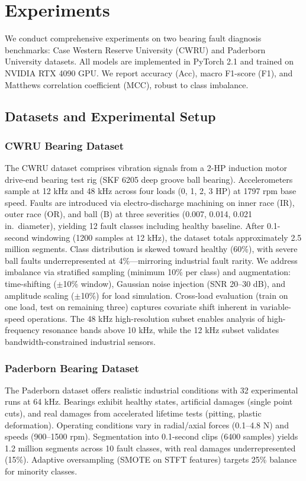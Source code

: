 \section{Experiments}

We conduct comprehensive experiments on two bearing fault diagnosis benchmarks: Case Western Reserve University (CWRU) and Paderborn University datasets. All models are implemented in PyTorch 2.1 and trained on NVIDIA RTX 4090 GPU. We report accuracy (Acc), macro F1-score (F1), and Matthews correlation coefficient (MCC), robust to class imbalance.

\subsection{Datasets and Experimental Setup}

\subsubsection{CWRU Bearing Dataset}
The CWRU dataset \cite{cite6} comprises vibration signals from a 2-HP induction motor drive-end bearing test rig (SKF 6205 deep groove ball bearing). Accelerometers sample at 12 kHz and 48 kHz across four loads (0, 1, 2, 3 HP) at 1797 rpm base speed. Faults are introduced via electro-discharge machining on inner race (IR), outer race (OR), and ball (B) at three severities (0.007, 0.014, 0.021 in.\ diameter), yielding 12 fault classes including healthy baseline. After 0.1-second windowing (1200 samples at 12 kHz), the dataset totals approximately 2.5 million segments. Class distribution is skewed toward healthy (60\%), with severe ball faults underrepresented at 4\%---mirroring industrial fault rarity. We address imbalance via stratified sampling (minimum 10\% per class) and augmentation: time-shifting ($\pm$10\% window), Gaussian noise injection (SNR 20--30 dB), and amplitude scaling ($\pm$10\%) for load simulation. Cross-load evaluation (train on one load, test on remaining three) captures covariate shift inherent in variable-speed operations. The 48 kHz high-resolution subset enables analysis of high-frequency resonance bands above 10 kHz, while the 12 kHz subset validates bandwidth-constrained industrial sensors.

\subsubsection{Paderborn Bearing Dataset}
The Paderborn dataset \cite{cite7} offers realistic industrial conditions with 32 experimental runs at 64 kHz. Bearings exhibit healthy states, artificial damages (single point cuts), and real damages from accelerated lifetime tests (pitting, plastic deformation). Operating conditions vary in radial/axial forces (0.1--4.8 N) and speeds (900--1500 rpm). Segmentation into 0.1-second clips (6400 samples) yields 1.2 million segments across 10 fault classes, with real damages underrepresented (15\%). Adaptive oversampling (SMOTE on STFT features) targets 25\% balance for minority classes.

